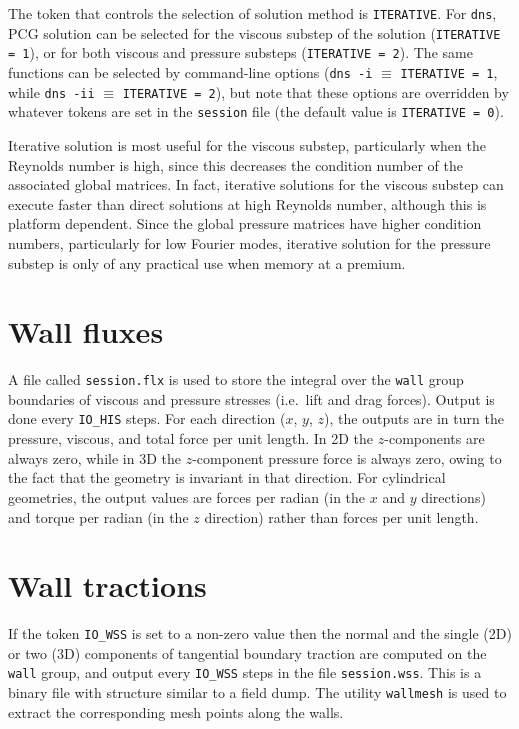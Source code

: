 \documentclass[11pt,a4paper]{report}
\begin{document}
The token that controls the selection of solution method is
\verb+ITERATIVE+.  For \verb+dns+, PCG solution can be selected for
the viscous substep of the solution (\verb+ITERATIVE = 1+), or for
both viscous and pressure substeps (\verb+ITERATIVE = 2+).  The same
functions can be selected by command-line options (\verb+dns -i+
$\equiv$ \verb+ITERATIVE = 1+, while \verb+dns -ii+ $\equiv$
\verb+ITERATIVE = 2+), but note that these options are overridden by
whatever tokens are set in the \verb+session+ file (the default value
is \verb+ITERATIVE = 0+).

Iterative solution is most useful for the viscous substep,
particularly when the Reynolds number is high, since this decreases
the condition number of the associated global matrices.  In fact,
iterative solutions for the viscous substep can execute faster than
direct solutions at high Reynolds number, although this is platform
dependent.  Since the global pressure matrices have higher condition
numbers, particularly for low Fourier modes, iterative solution for
the pressure substep is only of any practical use when memory at a
premium.

\section{Wall fluxes}

A file called \verb+session.flx+ is used to store the integral over
the \verb+wall+ group boundaries of viscous and pressure stresses
(i.e.\ lift and drag forces).  Output is done every \verb+IO_HIS+
steps.  For each direction ($x$, $y$, $z$), the outputs are in turn
the pressure, viscous, and total force per unit length.  In 2D the
$z$-components are always zero, while in 3D the $z$-component pressure
force is always zero, owing to the fact that the geometry is invariant
in that direction.  For cylindrical geometries, the output values are
forces per radian (in the $x$ and $y$ directions) and torque per
radian (in the $z$ direction) rather than forces per unit length.

\section{Wall tractions}

If the token \verb+IO_WSS+ is set to a non-zero value then the normal
and the single (2D) or two (3D) components of tangential boundary
traction are computed on the \verb+wall+ group, and output every
\verb+IO_WSS+ steps in the file \verb+session.wss+.  This is a binary
file with structure similar to a field dump.  The utility
\verb+wallmesh+ is used to extract the corresponding mesh points
along the walls.
\end{document}

